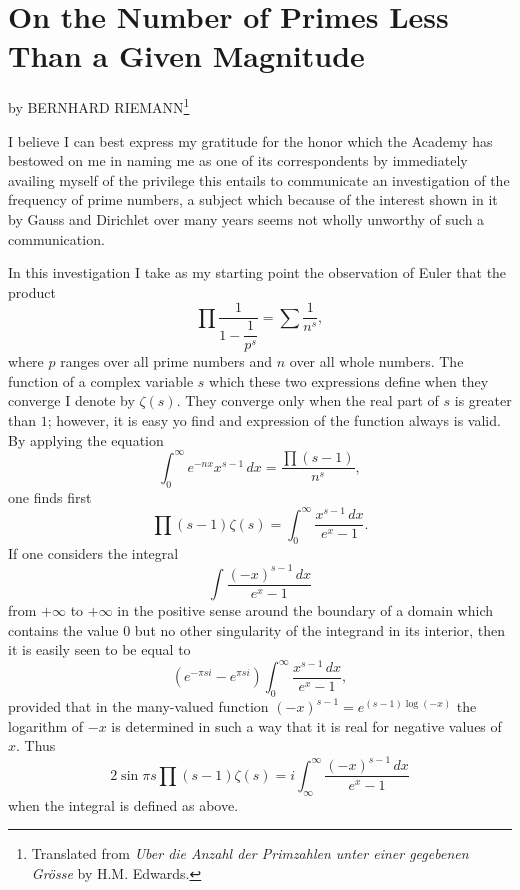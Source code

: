\appendix
\chapter{On the Number of Primes Less Than a Given Magnitude}


\begin{flushleft}
\rightskip=0.5cm
by BERNHARD RIEMANN\footnote{Translated from \textit{Uber die Anzahl der Primzahlen unter einer gegebenen Grösse} by H.M. Edwards.}
\end{flushleft}

I believe I can best express my gratitude for the honor which the Academy 
has bestowed on me in naming me as one of its correspondents by immediately 
availing myself of the privilege this entails to communicate an investigation
of the frequency of prime numbers, a subject which because of the interest
shown in it by Gauss and Dirichlet over many years seems not wholly unworthy
of such a communication.

In this investigation I take as my starting point the observation of Euler
that the product
%
\[
\prod \frac{1}{1 - \dfrac{1}{p^s}} = \sum \frac{1}{n^s},
\]
%
where $p$ ranges over all prime numbers and $n$ over all whole numbers. The
function of a complex variable $s$ which these two expressions define when they
converge I denote by $\zeta(s)$. They converge only when the real part of $s$
is greater than $1$; however, it is easy yo find and expression of the function
always is valid. By applying the equation
%
\[
\int_0^{\infty} e^{-nx}x^{s-1} \, dx = \frac{\prod(s-1)}{n^s},
\]
%
one finds first
%
\[
\prod(s-1)\zeta(s) = \int_0^{\infty} \frac{x^{s-1}\, dx}{e^x - 1}.
\]
%
If one considers the integral
%
\[
\int \frac{(-x)^{s-1} \, dx}{e^x - 1}
\]
%
from $+\infty$ to $+\infty$ in the positive sense around the boundary
of a domain which contains the value 0 but no other singularity of the
integrand in its interior, then it is easily seen to be equal to
%
\[
(e^{-\pi si} - e^{\pi si})\int_0^{\infty} \frac{x^{s-1} \, dx}{e^x - 1},
\]
%
provided that in the many-valued function $(-x)^{s-1} = e^{(s-1)\log(-x)}$
the logarithm of $-x$ is determined in such a way that it is real for negative
values of $x$. Thus
%
\[
2\sin\pi s\prod(s-1)\zeta(s) 
= i \int_{\infty}^{\infty} \frac{(-x)^{s-1} \, dx}{e^x - 1}
\]
%
when the integral is defined as above.

